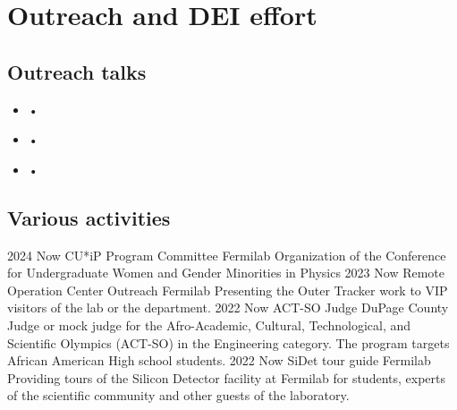 \ifacademic
  \section{Outreach and DEI effort}
  \subsection{Outreach talks}
\vskip 10pt

\begin{itemize}

\item  {} • ~

\item  {} • ~

\item  {} • ~

\end{itemize}

\subsection{Various activities}
\position
      {2024 \textemdash{} Now} 
      {CU*iP Program Committee}
      {Fermilab}
      {Organization of the Conference for Undergraduate Women and Gender Minorities in Physics}
\position
      {2023 \textemdash{} Now} 
      {Remote Operation Center Outreach}
      {Fermilab}
      {Presenting the Outer Tracker work to VIP visitors of the lab or the department.}
\position
      {2022 \textemdash{} Now} 
      {ACT-SO Judge}
      {DuPage County}
      {Judge or mock judge for the Afro-Academic, Cultural, Technological, and Scientific Olympics (ACT-SO) in the Engineering category. The program targets African American High school students.}
     \position
      {2022 \textemdash{} Now} 
      {SiDet tour guide}
      {Fermilab}
      {Providing tours of the Silicon Detector facility at Fermilab for students, experts of the scientific community and other guests of the laboratory.}

